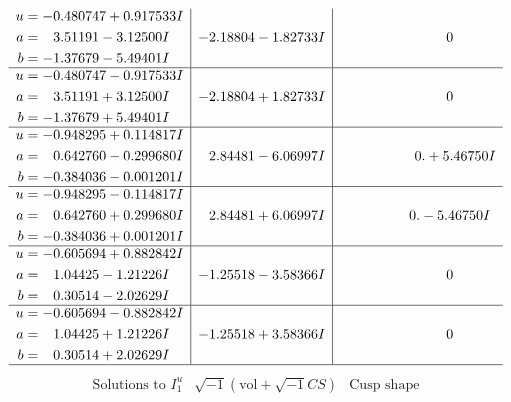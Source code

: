 \documentclass[1p]{elsarticle_modified}
\theoremstyle{definition}
\newcommand{\I}{\sqrt{-1}}
\begin{document}
$$\begin{array}{c|c|c}
\begin{aligned}
u &= -0.480747 + 0.917533 I \\
a &= \phantom{-}3.51191 - 3.12500 I \\
b &= -1.37679 - 5.49401 I\end{aligned}
 & -2.18804 - 1.82733 I & \phantom{-0.000000 } 0 \\ \hline\begin{aligned}
u &= -0.480747 - 0.917533 I \\
a &= \phantom{-}3.51191 + 3.12500 I \\
b &= -1.37679 + 5.49401 I\end{aligned}
 & -2.18804 + 1.82733 I & \phantom{-0.000000 } 0 \\ \hline\begin{aligned}
u &= -0.948295 + 0.114817 I \\
a &= \phantom{-}0.642760 - 0.299680 I \\
b &= -0.384036 - 0.001201 I\end{aligned}
 & \phantom{-}2.84481 - 6.06997 I & \phantom{-0.000000 -}0. + 5.46750 I \\ \hline\begin{aligned}
u &= -0.948295 - 0.114817 I \\
a &= \phantom{-}0.642760 + 0.299680 I \\
b &= -0.384036 + 0.001201 I\end{aligned}
 & \phantom{-}2.84481 + 6.06997 I & \phantom{-0.000000 } 0. - 5.46750 I \\ \hline\begin{aligned}
u &= -0.605694 + 0.882842 I \\
a &= \phantom{-}1.04425 - 1.21226 I \\
b &= \phantom{-}0.30514 - 2.02629 I\end{aligned}
 & -1.25518 - 3.58366 I & \phantom{-0.000000 } 0 \\ \hline\begin{aligned}
u &= -0.605694 - 0.882842 I \\
a &= \phantom{-}1.04425 + 1.21226 I \\
b &= \phantom{-}0.30514 + 2.02629 I\end{aligned}
 & -1.25518 + 3.58366 I & \phantom{-0.000000 } 0\\
 \hline 
 \end{array}$$\newpage$$\begin{array}{c|c|c}  
\text{Solutions to }I^u_{1}& \I (\text{vol} + \sqrt{-1}CS) & \text{Cusp shape}\\
 \hline 
\begin{aligned}

\end{aligned}
\end{array}$$
\end{document}

